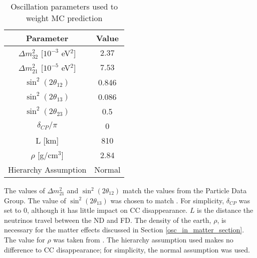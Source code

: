 \begin{table}
\begin{center}
\begin{tabular}{|c|c|}
\hline
\textbf{Parameter} & \textbf{Value}\tabularnewline
\hline
\hline
$\Delta m_{32}^{2}$ [$10^{-3}$ eV$^2$] & $2.37$ \tabularnewline
\hline
$\Delta m_{21}^{2}$ [$10^{-5}$ eV$^2$] & $7.53$ \tabularnewline
\hline
$\sin^2(2\theta_{12})$ & 0.846 \tabularnewline
\hline
$\sin^2(2\theta_{13})$ & 0.086 \tabularnewline
\hline
$\sin^2(2\theta_{23})$ & 0.5 \tabularnewline
\hline
$\delta_{CP} / \pi$ & 0 \tabularnewline
\hline
L [km] & 810 \tabularnewline
\hline
$\rho$ [g/cm$^3$] & 2.84 \tabularnewline
\hline
Hierarchy Assumption& Normal \tabularnewline
\hline
\end{tabular}
\end{center}
\caption{Oscillation parameters used to weight MC prediction}
{
The values of $\Delta m_{21}^{2}$ and $\sin^2(2\theta_{12})$ match the values
from the Particle Data Group. The value of $\sin^2(2\theta_{13})$
was chosen to match \cite{nova2016nue}.
For simplicity, $\delta_{CP}$ was set to 0, although it has little impact on
\numu CC disappearance.
$L$ is the distance the neutrinos travel between the ND and FD.
The density of the earth, $\rho$, is necessary for the matter effects
discussed in Section \ref{osc_in_matter_section}.
The value for $\rho$ was taken from \cite{bassin2000crust}.
The hierarchy assumption used makes no difference to \numu CC disappearance;
for simplicity, the normal assumption was used.
}
\label{osc_par_table}
\end{table}


